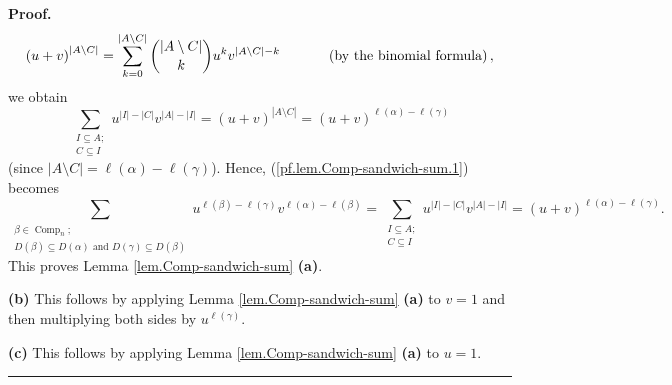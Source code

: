 \documentclass[numbers=enddot,12pt,final,onecolumn,notitlepage]{scrartcl}%
\theoremstyle{definition}
\newenvironment{proof}[1][Proof]{\noindent\textbf{#1.} }{\ \rule{0.5em}{0.5em}}
\let\sumnonlimits\sum
\renewcommand{\sum}{\sumnonlimits\limits}
\newenvironment{vershort}{}{}
\begin{document}
\begin{vershort}
\begin{proof}
\[
\left(  u+v\right)  ^{\left\vert A\setminus C\right\vert }=\sum_{k=0}%
^{\left\vert A\setminus C\right\vert }\dbinom{\left\vert A\setminus
C\right\vert }{k}u^{k}v^{\left\vert A\setminus C\right\vert -k}%
\ \ \ \ \ \ \ \ \ \ \left(  \text{by the binomial formula}\right)  ,
\]
we obtain%
\[
\sum_{\substack{I\subseteq A;\\C\subseteq I}}u^{\left\vert I\right\vert
-\left\vert C\right\vert }v^{\left\vert A\right\vert -\left\vert I\right\vert
}=\left(  u+v\right)  ^{\left\vert A\setminus C\right\vert }=\left(
u+v\right)  ^{\ell\left(  \alpha\right)  -\ell\left(  \gamma\right)  }%
\]
(since $\left\vert A\setminus C\right\vert =\ell\left(  \alpha\right)
-\ell\left(  \gamma\right)  $). Hence, (\ref{pf.lem.Comp-sandwich-sum.1})
becomes%
\[
\sum_{\substack{\beta\in\operatorname*{Comp}\nolimits_{n};\\D\left(
\beta\right)  \subseteq D\left(  \alpha\right)  \text{ and }D\left(
\gamma\right)  \subseteq D\left(  \beta\right)  }}u^{\ell\left(  \beta\right)
-\ell\left(  \gamma\right)  }v^{\ell\left(  \alpha\right)  -\ell\left(
\beta\right)  }=\sum_{\substack{I\subseteq A;\\C\subseteq I}}u^{\left\vert
I\right\vert -\left\vert C\right\vert }v^{\left\vert A\right\vert -\left\vert
I\right\vert }=\left(  u+v\right)  ^{\ell\left(  \alpha\right)  -\ell\left(
\gamma\right)  }.
\]
This proves Lemma \ref{lem.Comp-sandwich-sum} \textbf{(a)}.

\textbf{(b)} This follows by applying Lemma \ref{lem.Comp-sandwich-sum}
\textbf{(a)} to $v=1$ and then multiplying both sides by $u^{\ell\left(
\gamma\right)  }$.

\textbf{(c)} This follows by applying Lemma \ref{lem.Comp-sandwich-sum}
\textbf{(a)} to $u=1$.
\end{proof}
\end{vershort}
\end{document}
